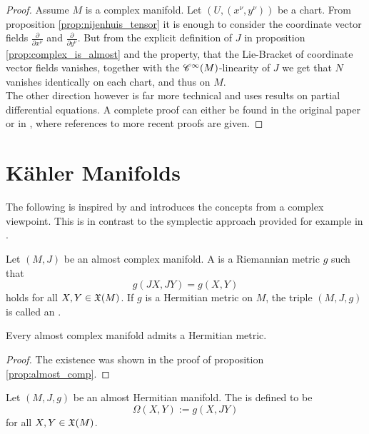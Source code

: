 \begin{proof}
Assume $M$ is a complex manifold. Let $(U,(x^\nu,y^\nu))$ be a chart. From proposition \ref{prop:nijenhuis_tensor} it is enough to consider the coordinate vector fields $\frac{\partial}{\partial x^\nu}$ and $\frac{\partial}{\partial y^\nu}$. But from the explicit definition of $J$  in proposition \ref{prop:complex_is_almost} and the property, that the Lie-Bracket of coordinate vector fields vanishes, together with the $\mathscr{C}^\infty(M)$-linearity of $J$ we get that $N$ vanishes identically on each chart, and thus on $M$.\\
The other direction however is far more technical and uses results on partial differential equations. A complete proof can either be found in the original paper \cite{newlander:coordinates:1957} or in \cite[106]{cannas:symplectic_geometry:2008}, where references to more recent proofs are given.
\end{proof}

\section{K\"ahler Manifolds}
The following is inspired by \cite[146--149]{kobayashi:diff_geo_II:1996} and introduces the concepts from a complex viewpoint. This is in contrast to the symplectic approach provided for example in \cite{cannas:symplectic_geometry:2008}.
\begin{definition}
Let $(M,J)$ be an almost complex manifold. A  is a Riemannian metric $g$ such that 
\begin{equation}
g(JX,JY) = g(X,Y)
\end{equation} 
\noindent holds for all $X,Y \in \mathfrak{X}(M)$. If $g$ is a Hermitian metric on $M$, the triple $(M,J,g)$ is called an .
\end{definition}

\begin{lemma}
Every almost complex manifold admits a Hermitian metric.
\end{lemma}

\begin{proof}
The existence was shown in the proof of proposition \ref{prop:almost_comp}.
\end{proof}

\begin{definition}
Let $(M,J,g)$ be an almost Hermitian manifold. The  is defined to be
\begin{equation}
\Omega(X,Y) := g(X,JY)
\end{equation}
\noindent for all $X,Y \in \mathfrak{X}(M)$.
\end{definition}


